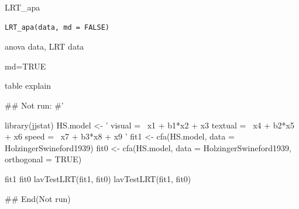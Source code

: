\documentclass[a4paper]{book}
\begin{document}
%
\begin{Description}
LRT\_apa
\end{Description}
%
\begin{Usage}
\begin{verbatim}
LRT_apa(data, md = FALSE)
\end{verbatim}
\end{Usage}
%
\begin{Arguments}
\begin{ldescription}
\item[\code{data}] anova data, LRT data

\item[\code{md}] md=TRUE
\end{ldescription}
\end{Arguments}
%
\begin{Value}
table explain
\end{Value}
%
\begin{Examples}
\begin{ExampleCode}

\#\# Not run: 
#'

library(jjstat)
HS.model <- '
    visual  =~ x1 + b1*x2 + x3
    textual =~ x4 + b2*x5 + x6
    speed   =~ x7 + b3*x8 + x9
'
fit1 <- cfa(HS.model, data = HolzingerSwineford1939)
fit0 <- cfa(HS.model, data = HolzingerSwineford1939,
            orthogonal = TRUE)

fit1 %
fit0 %
lavTestLRT(fit1, fit0)
lavTestLRT(fit1, fit0) %

## End(Not run)


\end{ExampleCode}
\end{Examples}
\end{document}
